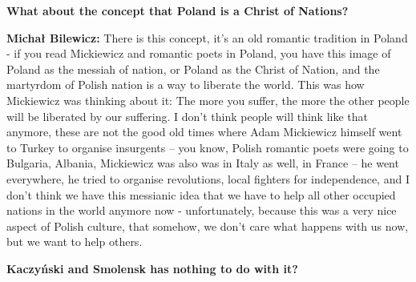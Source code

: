\textbf{What about the concept that Poland is a Christ of Nations?}

\textbf{Michał Bilewicz:} There is this concept, it’s an old romantic tradition in Poland - if you read Mickiewicz and romantic poets in Poland, you have this image of Poland as the messiah of nation, or Poland as the Christ of Nation, and the martyrdom of Polish nation is a way to liberate the world. This was how Mickiewicz was thinking about it: The more you suffer, the more the other people will be liberated by our suffering. I don’t think people will think like that anymore, these are not the good old times where Adam Mickiewicz himself went to Turkey to organise insurgents – you know, Polish romantic poets were going to Bulgaria, Albania, Mickiewicz was also was in Italy as well, in France – he went everywhere, he tried to organise revolutions, local fighters for independence, and I don’t think we have this messianic idea that we have to help all other occupied nations in the world anymore now - unfortunately, because this was a very nice aspect of Polish culture, that somehow, we don’t care what happens with us now, but we want to help others.

\textbf{Kaczyński and Smolensk has nothing to do with it?}

